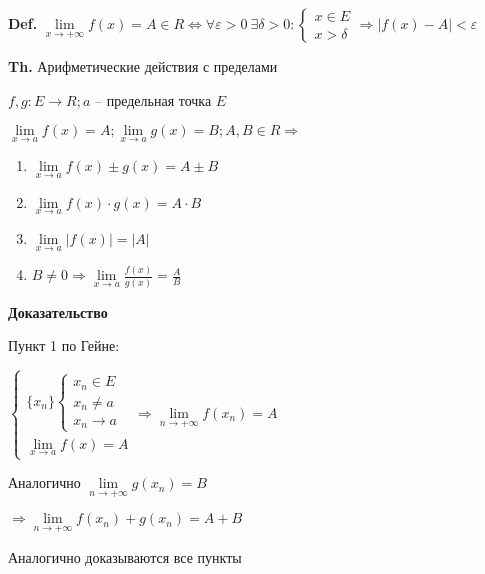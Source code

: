 \documentclass[14pt, letter paper]{article}
\begin{document}
\textbf{Def.} $\lim\limits_{x \rightarrow +\infty}{f(x)} = A \in R \Leftrightarrow \forall \varepsilon > 0\ \exists \delta > 0 : \begin{cases}
    x \in E \\
    x > \delta
\end{cases} \Rightarrow |f(x) - A| < \varepsilon$

\textbf{Th.} Арифметические действия с пределами

$f, g : E \rightarrow R; a$ -- предельная точка $E$

$\lim\limits_{x \rightarrow a}{f(x)} = A; \lim\limits_{x \rightarrow a}{g(x)} = B; A, B \in R \Rightarrow$

\begin{enumerate}
    \item $\lim\limits_{x \rightarrow a}{f(x)\pm g(x)} = A \pm B$
    \item $\lim\limits_{x \rightarrow a}{f(x) \cdot g(x)} = A \cdot B$
    \item $\lim\limits_{x \rightarrow a}{|f(x)|} = |A|$
    \item $B \neq 0 \Rightarrow \lim\limits_{x \rightarrow a}{\frac{f(x)}{g(x)}} = \frac{A}{B}$
\end{enumerate}

\begin{center}
    \textbf{Доказательство}
\end{center}

Пункт 1 по Гейне:

\vspace{2mm}

$\begin{cases}
    \{x_n\} \begin{cases}
        x_n \in E \\
        x_n \neq a \\
        x_n \rightarrow a
    \end{cases} \\
    \lim\limits_{x \rightarrow a}{f(x)} = A
\end{cases} \Rightarrow \lim\limits_{n \rightarrow +\infty}{f(x_n)} = A$

Аналогично $\lim\limits_{n \rightarrow +\infty}{g(x_n)} = B$

$\Rightarrow \lim\limits_{n \rightarrow +\infty}{f(x_n) + g(x_n)} = A + B$

Аналогично доказываются все пункты

\vspace{5mm}
\end{document}
